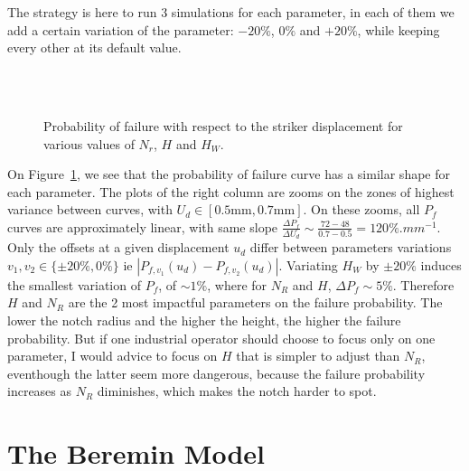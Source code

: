 \documentclass[
10pt, %
a4paper, %
oneside, %
headinclude,footinclude, %
BCOR5mm, %
]{scrartcl}
\begin{document}
The strategy is here to run $3$ simulations for each parameter,
in each of them we add a certain variation of the parameter: $-20\%$, $0\%$ and $+20\%$,
while keeping every other at its default value.

\begin{figure}[H]
    \centering
    \hfill
    \\
    \hfill
    \\
    \hfill

    \caption{Probability of failure with respect to the striker displacement for
        various values of $N_r$, $H$ and $H_W$.}
    \label{fig:param-var}
\end{figure}

On Figure~\ref{fig:param-var}, we see that the probability of failure curve
has a similar shape for each parameter. The plots of the right column are zooms
on the zones of highest variance between curves, with $U_d \in [0.5 \text{mm}, 0.7 \text{mm}]$.
On these zooms, all $P_f$ curves are approximately linear, with same slope
$\frac{\Delta P_f}{\Delta U_d} \sim \frac{72-48}{0.7-0.5} = 120 \%.mm^{-1}$.
Only the offsets at a given displacement $u_d$ differ between parameters variations $v_1,v_2 \in \{\pm 20\%, 0\%\}$ ie
$|P_{f,v_1}(u_d) - P_{f,v_2}(u_d)|$.
Variating $H_W$ by $\pm 20\%$ induces the smallest variation of $P_f$, of $\sim 1\%$,
where for $N_R$ and $H$, $\Delta P_f \sim 5\%$.
Therefore $H$ and $N_R$ are the 2 most impactful parameters on the failure probability.
The lower the notch radius and the higher the height, the higher the failure
probability. But if one industrial operator should choose to focus only
on one parameter, I would advice to focus on $H$ that is simpler to
adjust than $N_R$, eventhough the latter seem more dangerous, because
the failure probability increases as $N_R$ diminishes, which makes
the notch harder to spot.

\section{The Beremin Model}
\end{document}
